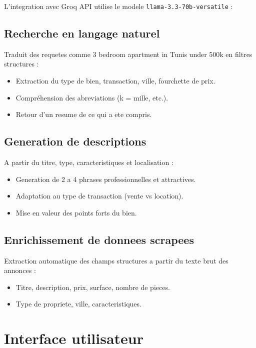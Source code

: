 \documentclass[12pt,a4paper]{report}
\begin{document}
L'integration avec Groq API utilise le modele \texttt{llama-3.3-70b-versatile} :

\subsection{Recherche en langage naturel}
Traduit des requetes comme \guillemotleft{} 3 bedroom apartment in Tunis under 500k \guillemotright{} en filtres structures :
\begin{itemize}
  \item Extraction du type de bien, transaction, ville, fourchette de prix.
  \item Compréhension des abreviations (k = mille, etc.).
  \item Retour d'un resume de ce qui a ete compris.
\end{itemize}

\subsection{Generation de descriptions}
A partir du titre, type, caracteristiques et localisation :
\begin{itemize}
  \item Generation de 2 a 4 phrases professionnelles et attractives.
  \item Adaptation au type de transaction (vente vs location).
  \item Mise en valeur des points forts du bien.
\end{itemize}

\subsection{Enrichissement de donnees scrapees}
Extraction automatique des champs structures a partir du texte brut des annonces :
\begin{itemize}
  \item Titre, description, prix, surface, nombre de pieces.
  \item Type de propriete, ville, caracteristiques.
\end{itemize}

\section{Interface utilisateur}
\end{document}
